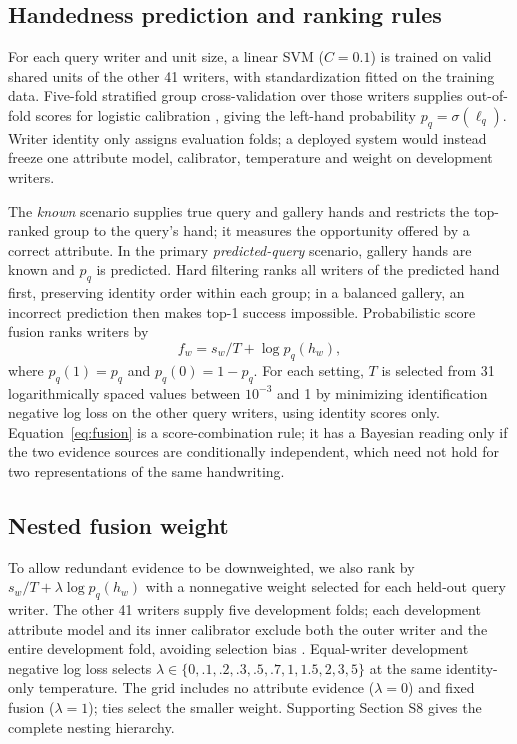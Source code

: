 \subsection{Handedness prediction and ranking rules}
\label{sec:rules}
For each query writer and unit size, a linear SVM ($C=0.1$) is trained on valid shared units of the other 41 writers, with standardization fitted on the training data. Five-fold stratified group cross-validation over those writers supplies out-of-fold scores for logistic calibration \cite{platt1999probabilistic}, giving the left-hand probability $p_q=\sigma(\ell_q)$. Writer identity only assigns evaluation folds; a deployed system would instead freeze one attribute model, calibrator, temperature and weight on development writers.

The \emph{known} scenario supplies true query and gallery hands and restricts the top-ranked group to the query's hand; it measures the opportunity offered by a correct attribute. In the primary \emph{predicted-query} scenario, gallery hands are known and $p_q$ is predicted. Hard filtering ranks all writers of the predicted hand first, preserving identity order within each group; in a balanced gallery, an incorrect prediction then makes top-1 success impossible. Probabilistic score fusion ranks writers by
\begin{equation}
 f_w=s_w/T+\log p_q(h_w),
 \label{eq:fusion}
\end{equation}
where $p_q(1)=p_q$ and $p_q(0)=1-p_q$. For each setting, $T$ is selected from 31 logarithmically spaced values between $10^{-3}$ and 1 by minimizing identification negative log loss on the other query writers, using identity scores only. Equation~\eqref{eq:fusion} is a score-combination rule; it has a Bayesian reading only if the two evidence sources are conditionally independent, which need not hold for two representations of the same handwriting.

\subsection{Nested fusion weight}
\label{sec:nested}
To allow redundant evidence to be downweighted, we also rank by $s_w/T+\lambda\log p_q(h_w)$ with a nonnegative weight selected for each held-out query writer. The other 41 writers supply five development folds; each development attribute model and its inner calibrator exclude both the outer writer and the entire development fold, avoiding selection bias \cite{cawley2010selection}. Equal-writer development negative log loss selects $\lambda\in\{0,.1,.2,.3,.5,.7,1,1.5,2,3,5\}$ at the same identity-only temperature. The grid includes no attribute evidence ($\lambda=0$) and fixed fusion ($\lambda=1$); ties select the smaller weight. Supporting Section S8 gives the complete nesting hierarchy.

